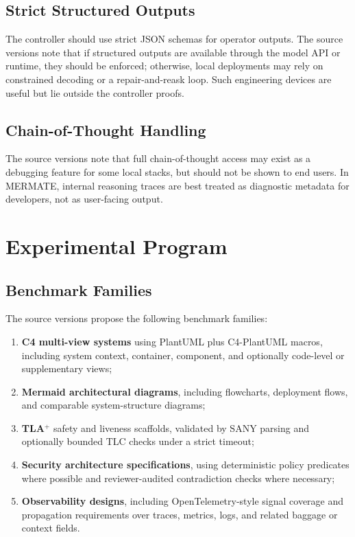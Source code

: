 \documentclass[11pt,a4paper]{article}
\numberwithin{equation}{section}
\theoremstyle{definition}
\begin{document}
\subsection{Strict Structured Outputs}

The controller should use strict JSON schemas for operator outputs. The source versions note that if structured outputs are available through the model API or runtime, they should be enforced; otherwise, local deployments may rely on constrained decoding or a repair-and-reask loop. Such engineering devices are useful but lie outside the controller proofs.

\subsection{Chain-of-Thought Handling}

The source versions note that full chain-of-thought access may exist as a debugging feature for some local stacks, but should not be shown to end users. In MERMATE, internal reasoning traces are best treated as diagnostic metadata for developers, not as user-facing output.

\section{Experimental Program}

\subsection{Benchmark Families}

The source versions propose the following benchmark families:
\begin{enumerate}[leftmargin=2.25em]
    \item \textbf{C4 multi-view systems} using PlantUML plus C4-PlantUML macros, including system context, container, component, and optionally code-level or supplementary views;
    \item \textbf{Mermaid architectural diagrams}, including flowcharts, deployment flows, and comparable system-structure diagrams;
    \item \textbf{TLA\(^+\)} safety and liveness scaffolds, validated by SANY parsing and optionally bounded TLC checks under a strict timeout;
    \item \textbf{Security architecture specifications}, using deterministic policy predicates where possible and reviewer-audited contradiction checks where necessary;
    \item \textbf{Observability designs}, including OpenTelemetry-style signal coverage and propagation requirements over traces, metrics, logs, and related baggage or context fields.
\end{enumerate}
\end{document}
